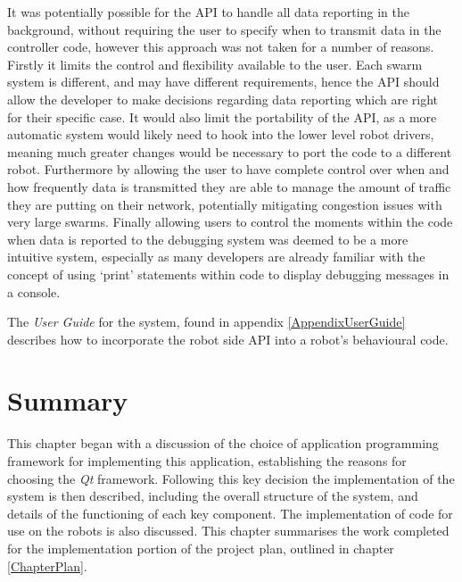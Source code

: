 It was potentially possible for the API to handle all data reporting in the background, without requiring the user to specify when to transmit data in the controller code, however this approach was not taken for a number of reasons. Firstly it limits the control and flexibility available to the user. Each swarm system is different, and may have different requirements, hence the API should allow the developer to make decisions regarding data reporting which are right for their specific case. It would also limit the portability of the API, as a more automatic system would likely need to hook into the lower level robot drivers, meaning much greater changes would be necessary to port the code to a different robot. Furthermore by allowing the user to have complete control over when and how frequently data is transmitted they are able to manage the amount of traffic they are putting on their network, potentially mitigating congestion issues with very large swarms. Finally allowing users to control the moments within the code when data is reported to the debugging system was deemed to be a more intuitive system, especially as many developers are already familiar with the concept of using `print' statements within code to display debugging messages in a console.

The \textit{User Guide} for the system, found in appendix \ref{AppendixUserGuide} describes how to incorporate the robot side API into a robot's behavioural code.


\section{Summary}
This chapter began with a discussion of the choice of application programming framework for implementing this application, establishing the reasons for choosing the \textit{Qt} framework. Following this key decision the implementation of the system is then described, including the overall structure of the system, and details of the functioning of each key component. The implementation of code for use on the robots is also discussed. This chapter summarises the work completed for the implementation portion of the project plan, outlined in chapter \ref{ChapterPlan}.